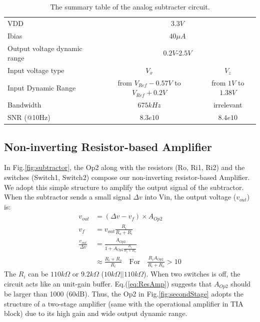 {\begin{table}[!htb]
    {\fontfamily{}\fontsize{10}{14}\selectfont
    \centering
    \begin{tabular}{l|c|c}
        VDD & \multicolumn{2}{|c}{$3.3V$}\\
        Ibias & \multicolumn{2}{|c}{$40\mu A$}\\
        Output voltage dynamic range & \multicolumn{2}{|c}{$0.2V$-$2.5V$}\\
        \hline
        \hline
        Input voltage type & $V_x$ & $V_z$\\
        \cline{2-3}
        Input Dynamic Range & from $V_{Ref} - 0.57V$ to $V_{Ref} + 0.2V$ & from $1V$ to $1.38V$ \\
        Bandwidth & $675k Hz$& irrelevant \\
        SNR (@10Hz) & $8.3e10$ & $8.4e10$ \\
    \end{tabular}
    \caption{The summary table of the analog subtracter circuit.}
    \label{tb:Subtractor}
    }
\end{table}

\subsection{Non-inverting Resistor-based Amplifier}

In Fig.\ref{fig:subtractor}, the Op2 along with the resistors (Ro, Ri1, Ri2) and the switches (Switch1, Switch2) compose our non-inverting resistor-based Amplifier.
We adopt this simple structure to amplify the output signal of the subtractor.
When the subtractor sends a small signal $\Delta v$ into Vin, the output voltage ($v_{out}$) is:
\begin{align}
    v_{out} &= (\Delta v - v_f) \times A_{Op2} \\
    v_f &= v_{out} \frac{R_i}{R_o + R_i} \\
    \frac{v_{out}}{\Delta v} &= \frac{A_{Op2}}{1 + A_{Op2}\frac{R_i}{R_i + R_o}} \\
    &\approx \frac{R_i + R_o}{R_i} \quad \text{For} \quad \frac{R_iA_{Op2}}{R_i + R_o} > 10 \label{eq:ResAmp}
\end{align}
The $R_i$ can be  $110k\Omega$ or $9.2k\Omega$ ($10k\Omega||110k\Omega$).
When two switches is off, the circuit acts like an unit-gain buffer.
Eq.(\ref{eq:ResAmp}) suggests that $A_{Op2}$ should be larger than 1000 (60dB).
Thus, the Op2 in Fig.\ref{fig:secondStage} adopts the structure of a two-stage amplifier (same with the operational amplifier in TIA block) due to its high gain and wide output dynamic range.

}
